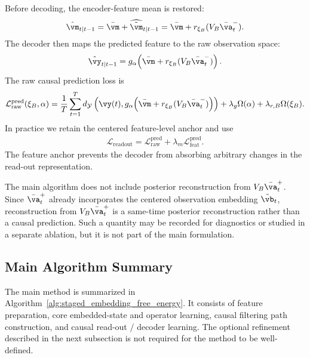 \documentclass[twoside,11pt]{article}
\begin{document}
Before decoding, the encoder-feature mean is restored:
\begin{align}
\hat{\vm}_{t|t-1}
=
\bar{\vm}
+
\widehat{\tilde{\vm}}_{t|t-1}
=
\bar{\vm}
+
r_{\xi_B}(V_B\bar{\va}_t^-).
\label{eq:phase3_mean_restored_feature}
\end{align}
The decoder then maps the predicted feature to the raw observation
space:
\begin{align}
\hat{\vy}_{t|t-1}
=
g_\alpha\!\left(
\bar{\vm}
+
r_{\xi_B}(V_B\bar{\va}_t^-)
\right).
\label{eq:phase3_raw_prediction}
\end{align}
The raw causal prediction loss is
\begin{align}
\mathcal L_{\mathrm{raw}}^{\mathrm{pred}}(\xi_B,\alpha)
=
\frac1T
\sum_{t=1}^T
d_{\mathcal Y}
\left(
\vy(t),
g_\alpha\!\left(
\bar{\vm}
+
r_{\xi_B}(V_B\bar{\va}_t^-)
\right)
\right)
+
\lambda_g\Omega(\alpha)
+
\lambda_{r,B}\Omega(\xi_B).
\label{eq:phase3_raw_loss}
\end{align}
In practice we retain the centered feature-level anchor and use
\begin{align}
\mathcal L_{\mathrm{readout}}
=
\mathcal L_{\mathrm{raw}}^{\mathrm{pred}}
+
\lambda_m
\mathcal L_{\mathrm{feat}}^{\mathrm{pred}}.
\label{eq:phase3_readout_loss}
\end{align}
The feature anchor prevents the decoder from absorbing arbitrary changes
in the read-out representation.

The main algorithm does not include posterior reconstruction from
$V_B\bar{\va}_t^+$. Since $\bar{\va}_t^+$ already incorporates the
centered observation embedding $\tilde{\vb}_t$, reconstruction from
$V_B\bar{\va}_t^+$ is a same-time posterior reconstruction rather than a
causal prediction. Such a quantity may be recorded for diagnostics or
studied in a separate ablation, but it is not part of the main
formulation.

\subsection{Main Algorithm Summary}

The main method is summarized in
Algorithm~\ref{alg:staged_embedding_free_energy}. It consists of
feature preparation, core embedded-state and operator learning, causal
filtering path construction, and causal read-out / decoder learning.
The optional refinement described in the next subsection is not required
for the method to be well-defined.
\end{document}
